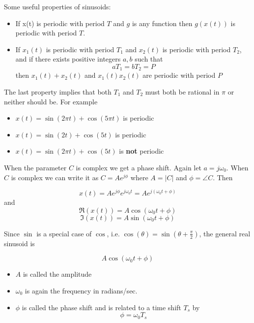 Some useful properties of sinusoids:

\begin{itemize}
\item If x(t) is periodic with period $T$ and $g$ is any function then $g(x(t))$ is periodic with period $T$.
\item If $x_1(t)$ is periodic with period $T_1$ and $x_2(t)$ is periodic with period $T_2$, and if there exists positive integers $a,b$ such that
  \[
  aT_1 = b T_2 = P
  \]
  then $x_1(t) + x_2(t)$ and $x_1(t)x_2(t)$ are periodic with period $P$
\end{itemize}
The last property implies that both $T_1$ and $T_2$ must both be rational in $\pi$ or neither should be. For example

\begin{itemize}
\item $x(t) = \sin(2\pi t) + \cos(5\pi t)$ is periodic
\item $x(t) = \sin(2 t) + \cos(5 t)$ is periodic
\item $x(t) = \sin(2\pi t) + \cos(5 t)$ is {\bf not} periodic
\end{itemize}

When the parameter $C$ is complex we get a phase shift. Again let $a = j\omega_0$. When $C$ is complex we can write it as $C = Ae^{j\phi}$ where $A = |C|$ and $\phi = \angle C$. Then

\[
x(t) = Ae^{j\phi} e^{j\omega_0 t} = Ae^{j(\omega_0 t+\phi)} 
\]
and
\[
\Re(x(t)) = A\cos(\omega_0 t+\phi) 
\]
\[
\Im(x(t)) = A\sin(\omega_0 t+\phi) 
\]

Since $\sin$ is a special case of $\cos$, i.e. $\cos(\theta) = \sin(\theta + \frac{\pi}{2})$, the general real sinusoid is

\[
A\cos(\omega_0 t + \phi)
\]
  
\begin{itemize}
\item $A$ is called the amplitude
\item $\omega_0$ is again the frequency in radians/sec.
\item $\phi$ is called the phase shift and is related to a time shift $T_s$ by
  \[
  \phi = \omega_0T_s
  \]
\end{itemize}

